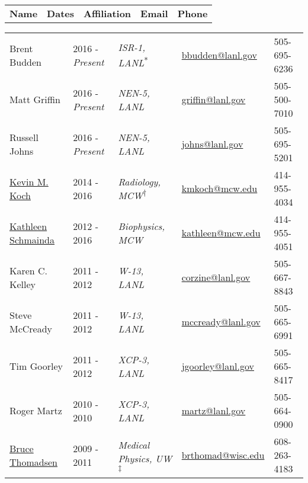 
\normalsize


\begin{center}
\begin{minipage}{\textwidth}
\begin{tabular}{p{3.2cm}p{2.2cm}p{3.7cm}p{5.0cm}p{2.4cm}}
\textbf{Name} & \textbf{Dates}  & \textbf{Affiliation} & \textbf{Email} & \textbf{Phone} \\
\end{tabular}
\end{minipage}
\end{center}


\begin{center}
\begin{minipage}{\textwidth}
\begin{tabular}{p{3.2cm}p{2.2cm}p{3.7cm}p{5.0cm}p{2.4cm}}
Brent Budden & 2016 - \emph{Present} & \textit{ISR-1, LANL}\textsuperscript{*} &  \href{mailto:bbudden@lanl.gov}{bbudden@lanl.gov} & 505-695-6236 \\
Matt Griffin & 2016 - \emph{Present} & \textit{NEN-5, LANL}                    &  \href{mailto:griffin@lanl.gov}{griffin@lanl.gov} & 505-500-7010 \\
Russell Johns & 2016 - \emph{Present} & \textit{NEN-5, LANL}                    &  \href{mailto:johns@lanl.gov}{johns@lanl.gov} & 505-695-5201 \\
\href{http://www.mcw.edu/radiology/faculty/Kevin-Koch-PhD.htm}{Kevin M. Koch} & 2014 - 2016 & \textit{Radiology, MCW}\textsuperscript{$\dagger$} & \href{mailto:kmkoch@mcw.edu}{kmkoch@mcw.edu} & 414-955-4034 \\
\href{http://www.mcw.edu/radiology/faculty/Kathleen-Schmainda-PhD.htm}{Kathleen Schmainda} & 2012 - 2016 & \textit{Biophysics, MCW}  & \href{mailto:kathleen@mcw.edu}{kathleen@mcw.edu} &  414-955-4051 \\
Karen C. Kelley & 2011 - 2012 & \textit{W-13, LANL} & \href{mailto:corzine@lanl.gov}{corzine@lanl.gov} & 505-667-8843 \\
Steve McCready & 2011 - 2012 &\textit{W-13, LANL} & \href{mailto:mccready@lanl.gov}{mccready@lanl.gov} & 505-665-6991 \\
Tim Goorley & 2011 - 2012 & \textit{XCP-3, LANL} &\href{mailto:jgoorley@lanl.gov}{jgoorley@lanl.gov} & 505-665-8417 \\
Roger Martz & 2010 - 2010 & \textit{XCP-3, LANL} & \href{mailto:martz@lanl.gov}{martz@lanl.gov} &  505-664-0900 \\
{\href{https://www.medphysics.wisc.edu/directory/thomadsen.php}{Bruce Thomadsen}} \label{bruce_thomadsen}& 2009 - 2011 & \textit{Medical Physics, UW}\textsuperscript{$\ddagger$} & \href{mailto:brthomad@wisc.edu}{brthomad@wisc.edu} &  608-263-4183 \\

\end{tabular}
\end{minipage}
\end{center}

